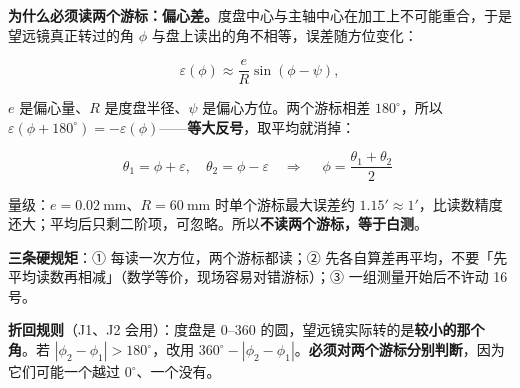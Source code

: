 \textbf{为什么必须读两个游标：偏心差。}度盘中心与主轴中心在加工上不可能重合，于是望远镜真正转过的角 $\phi$ 与盘上读出的角不相等，误差随方位变化：

\[
\varepsilon(\phi)\approx\frac{e}{R}\sin(\phi-\psi),
\]

$e$ 是偏心量、$R$ 是度盘半径、$\psi$ 是偏心方位。两个游标相差 $180^{\circ}$，所以 $\varepsilon(\phi+180^{\circ})=-\varepsilon(\phi)$——\textbf{等大反号}，取平均就消掉：

\[
\theta_1=\phi+\varepsilon,\quad \theta_2=\phi-\varepsilon
\quad\Longrightarrow\quad
\boxed{\;\phi=\frac{\theta_1+\theta_2}{2}\;}
\]

量级：$e=0.02\ \mathrm{mm}$、$R=60\ \mathrm{mm}$ 时单个游标最大误差约 $1.15'\approx1'$，比读数精度还大；平均后只剩二阶项，可忽略。所以\textbf{不读两个游标，等于白测}。

\textbf{三条硬规矩}：① 每读一次方位，两个游标都读；② 先各自算差再平均，不要「先平均读数再相减」（数学等价，现场容易对错游标）；③ 一组测量开始后不许动 16 号。

\textbf{折回规则}（J1、J2 会用）：度盘是 $0$--$360$ 的圆，望远镜实际转的是\textbf{较小的那个角}。若 $|\phi_2-\phi_1|>180^{\circ}$，改用 $360^{\circ}-|\phi_2-\phi_1|$。\textbf{必须对两个游标分别判断}，因为它们可能一个越过 $0^{\circ}$、一个没有。


